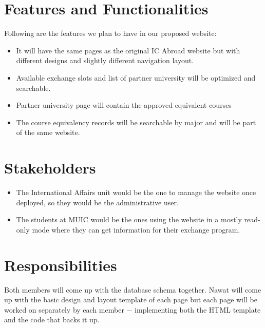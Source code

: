 \documentclass{report}
\begin{document}
\section*{Features and Functionalities}
Following are the features we plan to have in our proposed website:
\begin{itemize}
    \item It will have the same pages as the original IC Abroad 
        website but with different designs and slightly different 
        navigation layout.
    \item Available exchange slots and list of partner university
        will be optimized and searchable.
    \item Partner university page will contain the approved 
        equivalent courses
    \item The course equivalency records will be searchable by
        major and will be part of the same website.
\end{itemize}

\section*{Stakeholders}
\begin{itemize}
    \item The International Affairs unit would be the one to
        manage the website once deployed, so they would be the
        administrative user.
    \item The students at MUIC would be the ones using the website
        in a mostly read-only mode where they can get information
        for their exchange program.
\end{itemize}

\section*{Responsibilities}
Both members will come up with the database schema together.
Nawat will come up with the basic design and layout template
of each page but each page will be worked on separately by
each member $-$ implementing both the HTML template and the
code that backs it up.
\end{document}
